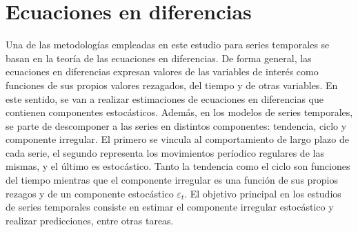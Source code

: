 \section{Ecuaciones en diferencias}

Una de las metodologías empleadas en este estudio para series temporales se basan en la teoría de las ecuaciones en diferencias. De forma general, las ecuaciones en diferencias expresan  valores de las variables de interés como funciones de sus propios valores rezagados, del tiempo y de otras variables.
En este sentido, se van a realizar estimaciones de ecuaciones en diferencias que contienen componentes estocásticos. 
Además, en los modelos de series temporales, se parte de descomponer a las series en distintos componentes: tendencia, ciclo y componente irregular. El primero se vincula al comportamiento de largo plazo de cada serie, el segundo representa los movimientos períodico regulares de las mismas, y el último es estocástico. Tanto la tendencia como el ciclo son funciones del tiempo mientras que el componente irregular es una función de sus propios rezagos y de un componente estocástico $\varepsilon_t$. El objetivo principal en los estudios de series temporales consiste en estimar el componente irregular estocástico y realizar predicciones, entre otras tareas.

